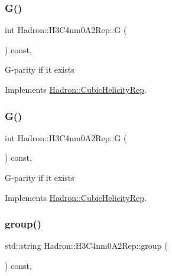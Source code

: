 \subsubsection{\texorpdfstring{G()}{G()}\hspace{0.1cm}{\footnotesize\ttfamily [1/2]}}
{\footnotesize\ttfamily int Hadron\+::\+H3\+C4nm0\+A2\+Rep\+::G (\begin{DoxyParamCaption}{ }\end{DoxyParamCaption}) const\hspace{0.3cm}{\ttfamily [inline]}, {\ttfamily [virtual]}}

G-\/parity if it exists 

Implements \mbox{\hyperlink{structHadron_1_1CubicHelicityRep_a50689f42be1e6170aa8cf6ad0597018b}{Hadron\+::\+Cubic\+Helicity\+Rep}}.

\mbox{\label{structHadron_1_1H3C4nm0A2Rep_a66c078d78251649317b94fa865face29}} 
\subsubsection{\texorpdfstring{G()}{G()}\hspace{0.1cm}{\footnotesize\ttfamily [2/2]}}
{\footnotesize\ttfamily int Hadron\+::\+H3\+C4nm0\+A2\+Rep\+::G (\begin{DoxyParamCaption}{ }\end{DoxyParamCaption}) const\hspace{0.3cm}{\ttfamily [inline]}, {\ttfamily [virtual]}}

G-\/parity if it exists 

Implements \mbox{\hyperlink{structHadron_1_1CubicHelicityRep_a50689f42be1e6170aa8cf6ad0597018b}{Hadron\+::\+Cubic\+Helicity\+Rep}}.

\mbox{\label{structHadron_1_1H3C4nm0A2Rep_a645f15ec66163ba3a04123eb5456f42d}} 
\subsubsection{\texorpdfstring{group()}{group()}\hspace{0.1cm}{\footnotesize\ttfamily [1/3]}}
{\footnotesize\ttfamily std\+::string Hadron\+::\+H3\+C4nm0\+A2\+Rep\+::group (\begin{DoxyParamCaption}{ }\end{DoxyParamCaption}) const\hspace{0.3cm}{\ttfamily [inline]}, {\ttfamily [virtual]}}

